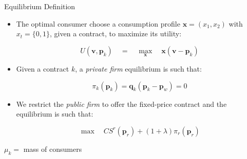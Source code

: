 \documentclass{class}
\begin{document}
\begin{frame}{Equilibrium Definition}


\begin{itemize}

\item The optimal consumer choose a consumption profile $\textbf{x} = (x_1,x_2)$ with $x_t =\{0,1\}$, given a contract, to maximize its utility:

\vfill

\begin{equation*}
U\left(\textbf{v},\textbf{p}_k\right) \quad = \quad  \max_{\textbf{x}} \quad \textbf{x} (\textbf{v} - \textbf{p}_k) 
\end{equation*}

\vfill
    
\item Given a contract $k$, a \textit{private firm} equilibrium is such that:

\vfill

\begin{equation*}
 \pi_k(\textbf{p}_{k}) = \textbf{q}_k (\textbf{p}_k - \textbf{p}_w)  =0 
\end{equation*}

\vfill

\item We restrict the \textit{public firm} to offer the fixed-price contract and the equilibrium is such that:

\vfill

\begin{equation*}
 \max \quad CS^r(\textbf{p}_r) + (1+\lambda)\pi_r(\textbf{p}_{r})
\end{equation*}

\end{itemize}

{\footnotesize $\mu_k = $ mass of consumers}
    
\end{frame}


\end{document}
